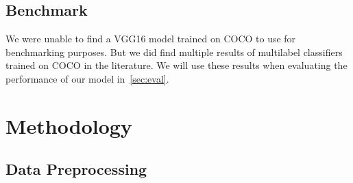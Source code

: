 \documentclass[12pt,journal,compsoc]{IEEEtran}
\begin{document}
\subsection{Benchmark}


We were unable to find a VGG16 model trained on COCO to use for benchmarking purposes.  But we did find multiple results of multilabel classifiers trained on COCO in the literature.  We will use these results when evaluating the performance of our model in~\ref{sec:eval}.

\section{Methodology}\label{sec:method} %
\subsection{Data Preprocessing}\label{sec:preproc}

\end{document}

